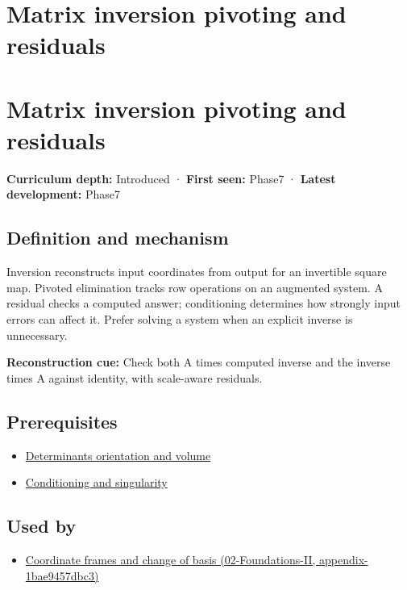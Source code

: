 \hypertarget{appendix-48d2e66378ab}{}
\section*{Matrix inversion pivoting and residuals}
\section{Matrix inversion pivoting and residuals}\label{matrix-inversion-pivoting-and-residuals}

\textbf{Curriculum depth:} Introduced · \textbf{First seen:} Phase7 · \textbf{Latest development:} Phase7

\subsection{Definition and mechanism}\label{definition-and-mechanism}

Inversion reconstructs input coordinates from output for an invertible square map. Pivoted elimination tracks row operations on an augmented system. A residual checks a computed answer; conditioning determines how strongly input errors can affect it. Prefer solving a system when an explicit inverse is unnecessary.

\textbf{Reconstruction cue:} Check both A times computed inverse and the inverse times A against identity, with scale-aware residuals.

\subsection{Prerequisites}\label{prerequisites}

\begin{itemize}
\tightlist
\item
  \hyperref[appendix-da478be01d02]{Determinants orientation and volume}
\item
  \hyperref[appendix-8f6a01f284a7]{Conditioning and singularity}
\end{itemize}

\subsection{Used by}\label{used-by}

\begin{itemize}
\tightlist
\item
  \href{}{Coordinate frames and change of basis (02-Foundations-II, appendix-1bae9457dbc3)}
\end{itemize}

